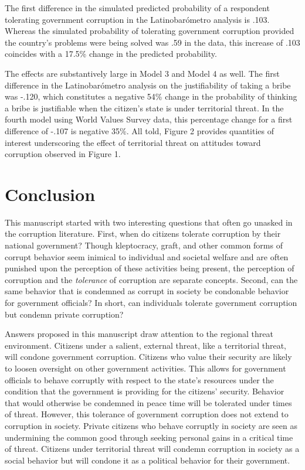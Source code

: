\documentclass[11pt,]{article}
\begin{document}
The first difference in the simulated predicted probability of a
respondent tolerating government corruption in the Latinobarómetro
analysis is .103. Whereas the simulated probability of tolerating
government corruption provided the country's problems were being solved
was .59 in the data, this increase of .103 coincides with a 17.5\%
change in the predicted probability.

The effects are substantively large in Model 3 and Model 4 as well. The
first difference in the Latinobarómetro analysis on the justifiability
of taking a bribe was -.120, which constitutes a negative 54\% change in
the probability of thinking a bribe is justifiable when the citizen's
state is under territorial threat. In the fourth model using World
Values Survey data, this percentage change for a first difference of
-.107 is negative 35\%. All told, Figure 2 provides quantities of
interest underscoring the effect of territorial threat on attitudes
toward corruption observed in Figure 1.

\section{Conclusion}\label{conclusion}

This manuscript started with two interesting questions that often go
unasked in the corruption literature. First, when do citizens tolerate
corruption by their national government? Though kleptocracy, graft, and
other common forms of corrupt behavior seem inimical to individual and
societal welfare and are often punished upon the perception of these
activities being present, the perception of corruption and the
\emph{tolerance} of corruption are separate concepts. Second, can the
same behavior that is condemned as corrupt in society be condonable
behavior for government officials? In short, can individuals tolerate
government corruption but condemn private corruption?

Answers proposed in this manuscript draw attention to the regional
threat environment. Citizens under a salient, external threat, like a
territorial threat, will condone government corruption. Citizens who
value their security are likely to loosen oversight on other government
activities. This allows for government officials to behave corruptly
with respect to the state's resources under the condition that the
government is providing for the citizens' security. Behavior that would
otherwise be condemned in peace time will be tolerated under times of
threat. However, this tolerance of government corruption does not extend
to corruption in society. Private citizens who behave corruptly in
society are seen as undermining the common good through seeking personal
gains in a critical time of threat. Citizens under territorial threat
will condemn corruption in society as a social behavior but will condone
it as a political behavior for their government.
\end{document}
